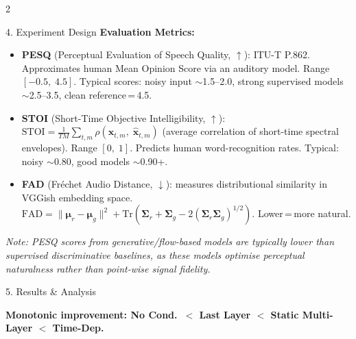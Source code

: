 \documentclass[a3paper,landscape,10pt]{article}
\begin{document}
\begin{multicols}{2}
\begin{sectionbox}{4. Experiment Design}
\smallskip
\textbf{Evaluation Metrics:}
\begin{itemize}[leftmargin=10pt,itemsep=1pt,topsep=1pt]
  \item \textbf{PESQ} (Perceptual Evaluation of Speech Quality, $\uparrow$): ITU-T P.862.
    Approximates human Mean Opinion Score via an auditory model.
    Range $[-0.5,\;4.5]$. Typical scores: noisy input $\sim$1.5--2.0, strong supervised models $\sim$2.5--3.5, clean reference\,=\,4.5.
  \item \textbf{STOI} (Short-Time Objective Intelligibility, $\uparrow$):
    $\text{STOI} = \frac{1}{TM}\sum_{t,m} \rho\!\left(\mathbf{x}_{t,m},\; \hat{\mathbf{x}}_{t,m}\right)$
    \enspace (average correlation of short-time spectral envelopes).
    Range $[0,\;1]$. Predicts human word-recognition rates. Typical: noisy $\sim$0.80, good models $\sim$0.90+.
  \item \textbf{FAD} (Fr\'echet Audio Distance, $\downarrow$): measures distributional similarity in VGGish embedding space.
    $\text{FAD} = \|\boldsymbol{\mu}_r - \boldsymbol{\mu}_g\|^2 + \text{Tr}\!\left(\boldsymbol{\Sigma}_r + \boldsymbol{\Sigma}_g - 2(\boldsymbol{\Sigma}_r\boldsymbol{\Sigma}_g)^{1/2}\right)$.
    Lower\,=\,more natural.
\end{itemize}

\textit{Note: PESQ scores from generative/flow-based models are typically lower than supervised discriminative baselines, as these models optimise perceptual naturalness rather than point-wise signal fidelity.}

\end{sectionbox}

\vfill\columnbreak

\begin{sectionbox}{5. Results \& Analysis}

\begin{keyresultbox}
\centering\small\textbf{Monotonic improvement: No Cond.\ $<$ Last Layer $<$ Static Multi-Layer $<$ Time-Dep.}
\end{keyresultbox}


\end{sectionbox}
\end{multicols}
\end{document}
